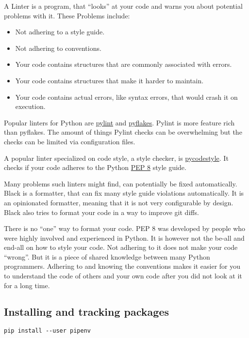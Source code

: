 \documentclass{article}
\begin{document}
A Linter is a program, that ``looks'' at your code and warns you about potential
problems with it. These Problems include:
\begin{itemize}
    \item Not adhering to a style guide.
    \item Not adhering to conventions.
    \item Your code contains structures that are commonly associated with errors.
    \item Your code contains structures that make it harder to maintain.
    \item Your code contains actual errors, like syntax errors, that would crash it on execution.
\end{itemize}

Popular linters for Python are \href{https://github.com/PyCQA/pylint}{pylint} and
\href{https://github.com/PyCQA/pyflakes}{pyflakes}.
Pylint is more feature rich than pyflakes.
The amount of things Pylint checks can be overwhelming but the checks can be limited
via configuration files.

A popular linter specialized on code style, a style checker,
is \href{https://github.com/PyCQA/pycodestyle}{pycodestyle}.
It checks if your code adheres to the Python
\href{https://www.python.org/dev/peps/pep-0008/}{PEP 8} style guide.

Many problems such linters might find, can potentially be fixed automatically.
Black is a formatter, that can fix many style guide violations automatically.
It is an opinionated formatter, meaning that it is not very configurable by design.
Black also tries to format your code in a way to improve git diffs.

There is no ``one'' way to format your code.
PEP 8 was developed by people who were highly involved and experienced in Python.
It is however not the be-all and end-all on how to style your code.
Not adhering to it does not make your code ``wrong''.
But it is a piece of shared knowledge between many Python programmers.
Adhering to and knowing the conventions makes it easier for you to understand
the code of others and your own code after you did not look at it for a long time.

\subsection{Installing and tracking packages}


\begin{lstlisting}
pip install --user pipenv
\end{lstlisting}
\end{document}
